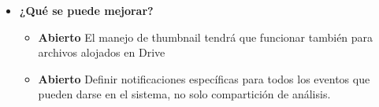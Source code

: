 \begin{itemize}
\begin{itemize}
                
			\end{itemize}

   		\item \textbf{¿Qué se puede mejorar?}
        	\begin{itemize}
		        \item \textbf{Abierto} El manejo de thumbnail tendrá que funcionar también para archivos alojados en Drive
		        \item \textbf{Abierto} Definir notificaciones específicas para todos los eventos que pueden darse en el sistema, no solo compartición de análisis.
            \end{itemize}
        

	\end{itemize}
